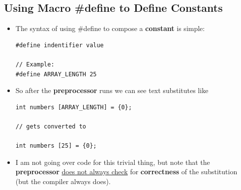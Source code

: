 \documentclass[10pt]{article}
\begin{document}
\subsection{Using Macro \#define to Define Constants}
\begin{itemize}
	\item The syntax of using \#define to compose a \textbf{constant} is simple:
		\begin{verbatim}
#define indentifier value
	
// Example:
#define ARRAY_LENGTH 25
		\end{verbatim}

	\item So after the \textbf{preprocessor} runs we can see text substitutes like
	\begin{verbatim}
int numbers [ARRAY_LENGTH] = {0}; 

// gets converted to

int numbers [25] = {0}; 
	\end{verbatim}

\item I am not going over code for this trivial thing, but note that the \textbf{preprocessor} \underline{does not always check} for \textbf{correctness} of the substitution (but the compiler always does).

\end{itemize}

\newpage
\end{document}
